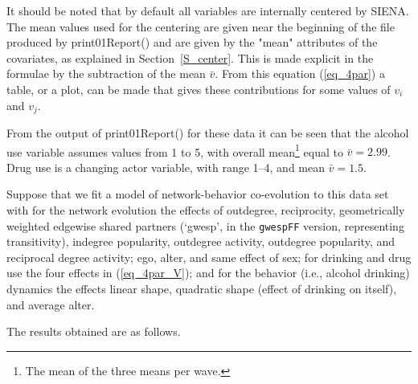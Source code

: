 \documentclass[a4paper,fleqn,11pt]{article}
\newcommand{\+}{\, + \,}
\newcommand{\sfn}[1]{\textsf{#1}}
\newcommand{\si}{{\sf SIENA}}
\begin{document}
It should be noted that by default all variables are internally centered by \si.
The mean values used for the centering
are given near the beginning of the file produced by
\sfn{print01Report()} and are given by the \textsf{"mean"}
attributes of the covariates, as explained in
Section~\ref{S_center}.
This is made explicit in the formulae by the subtraction
of the mean $\bar v$.
From this equation (\ref{eq_4par}) a table, or a plot, can be made
that gives these contributions for some values of $v_i$ and $v_j$.

From the output of \sfn{print01Report()} for these data it can be seen that
the alcohol use variable assumes values from 1 to 5, with overall
mean\footnote{The mean of the three means per wave.}
equal to $\bar v = 2.99$.
Drug use is a changing actor variable, with
range 1--4, and mean $\bar v = 1.5$.

Suppose that we fit a model of network-behavior co-evolution to this data set
with for the network evolution the effects of outdegree, reciprocity,
geometrically weighted edgewise shared partners (`gwesp', in the
\texttt{gwespFF} version, representing transitivity),
indegree popularity, outdegree activity, outdegree popularity,
and reciprocal degree activity; ego, alter, and same effect of sex;
for drinking and drug use the four effects in (\ref{eq_4par_V});
and for the  behavior (i.e., alcohol drinking) dynamics the
effects linear shape, quadratic shape (effect of drinking on itself),
and average alter.

The results obtained are as follows.\\
\end{document}
